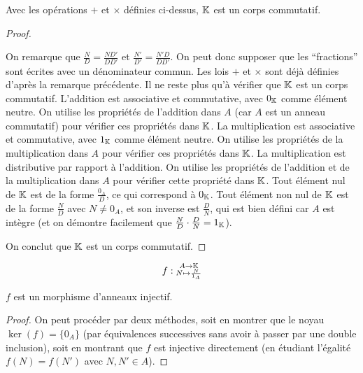 \documentclass[12pt,a4paper]{report}
\begin{document}
\begin{property}
    Avec les opérations $+$ et $\times$ définies ci-dessus, $\mathbb{K}$ est un corps commutatif.
\end{property}

\begin{proof}
    \begin{outline}
        \1 On remarque que $\frac ND = \frac{ND'}{DD'}$ et $\frac{N'}{D'} = \frac{N'D}{DD'}$.
        \1 On peut donc supposer que les ``fractions'' sont écrites avec un dénominateur commun.
        \1 Les lois $+$ et $\times$ sont déjà définies d'après la remarque précédente.
        \1 Il ne reste plus qu'à vérifier que $\mathbb{K}$ est un corps commutatif.
        \2 L'addition est associative et commutative, avec $0_{\mathbb{K}}$ comme élément neutre. On utilise les propriétés de l'addition dans $A$ (car $A$ est un anneau commutatif) pour vérifier ces propriétés dans $\mathbb{K}$.
        \2 La multiplication est associative et commutative, avec $1_{\mathbb{K}}$ comme élément neutre. On utilise les propriétés de la multiplication dans $A$ pour vérifier ces propriétés dans $\mathbb{K}$.
        \2 La multiplication est distributive par rapport à l'addition. On utilise les propriétés de l'addition et de la multiplication dans $A$ pour vérifier cette propriété dans $\mathbb{K}$.
        \2 Tout élément nul de $\mathbb{K}$ est de la forme $\frac{0_A}{D}$, ce qui correspond à $0_{\mathbb{K}}$. Tout élément non nul de $\mathbb{K}$ est de la forme $\frac{N}{D}$ avec $N \neq 0_A$, et son inverse est $\frac{D}{N}$, qui est bien défini car $A$ est intègre (et on démontre facilement que $\frac{N}{D} \cdot \frac{D}{N} = 1_{\mathbb{K}}$).
    \end{outline}
    On conclut que $\mathbb{K}$ est un corps commutatif.
\end{proof}

\begin{property}
    
    $$f : \substack{A \to \mathbb{K}\\ N \mapsto \frac{N}{1_A}}$$

    $f$ est un morphisme d'anneaux injectif.
\end{property}

\begin{proof}
    On peut procéder par deux méthodes, soit en montrer que le noyau $\ker(f) = \{0_A\}$ (par équivalences successives sans avoir à passer par une double inclusion), soit en montrant que $f$ est injective directement (en étudiant l'égalité $f(N) = f(N')$ avec $N, N' \in A$).
\end{proof}
\end{document}
